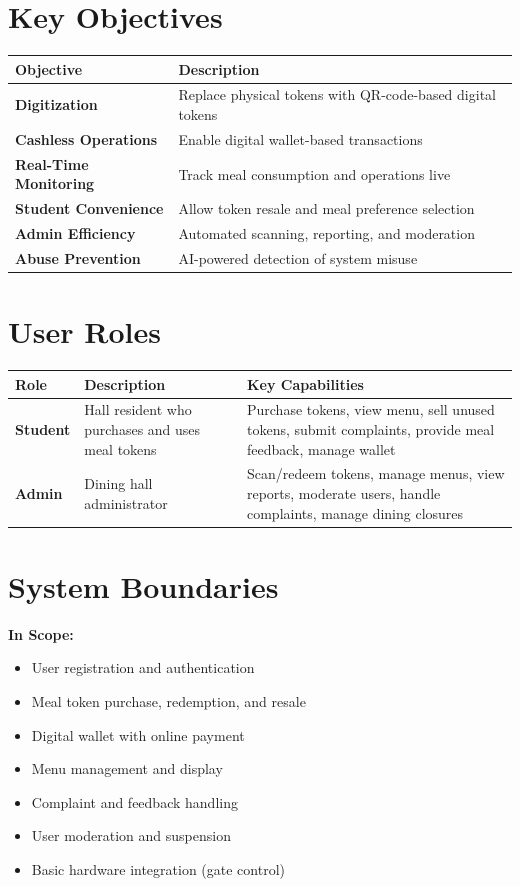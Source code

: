 \documentclass[11pt,a4paper]{report}
\begin{document}
\section{Key Objectives}
\begin{longtable}{@{}ll@{}}
\toprule
\textbf{Objective} & \textbf{Description} \\ \midrule
\textbf{Digitization} & Replace physical tokens with QR-code-based digital tokens \\
\textbf{Cashless Operations} & Enable digital wallet-based transactions \\
\textbf{Real-Time Monitoring} & Track meal consumption and operations live \\
\textbf{Student Convenience} & Allow token resale and meal preference selection \\
\textbf{Admin Efficiency} & Automated scanning, reporting, and moderation \\
\textbf{Abuse Prevention} & AI-powered detection of system misuse \\ \bottomrule
\end{longtable}

\section{User Roles}
\begin{longtable}{@{}p{}p{}p{}@{}}
\toprule
\textbf{Role} & \textbf{Description} & \textbf{Key Capabilities} \\ \midrule
\textbf{Student} & Hall resident who purchases and uses meal tokens & Purchase tokens, view menu, sell unused tokens, submit complaints, provide meal feedback, manage wallet \\
\textbf{Admin} & Dining hall administrator & Scan/redeem tokens, manage menus, view reports, moderate users, handle complaints, manage dining closures \\ \bottomrule
\end{longtable}

\section{System Boundaries}
\textbf{In Scope:}
\begin{itemize}
    \item User registration and authentication
    \item Meal token purchase, redemption, and resale
    \item Digital wallet with online payment
    \item Menu management and display
    \item Complaint and feedback handling
    \item User moderation and suspension
    \item Basic hardware integration (gate control)
\end{itemize}
\end{document}
